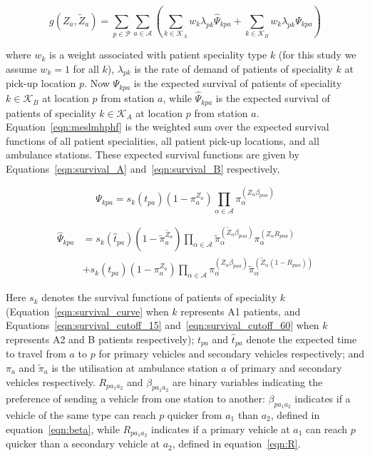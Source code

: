 \documentclass[preprint,12pt]{elsarticle}
\begin{document}
\begin{equation}\label{eqn:meslmhphf}
g\left(Z_a, \tilde{Z}_a\right) = \sum_{p \in \mathcal{P}} \sum_{a \in \mathcal{A}} \left( \sum_{k \in \mathcal{K}_A}  w_k \lambda_{pk} \hat{\Psi}_{kpa} + \sum_{k \in \mathcal{K}_B}  w_k \lambda_{pk} \Psi_{kpa} \right)
\end{equation}

where $w_k$ is a weight associated with patient speciality type $k$ (for this study we assume $w_k = 1$ for all $k$), $\lambda_{pk}$ is the rate of demand of patients of speciality $k$ at pick-up location $p$. Now $\Psi_{kpa}$ is the expected survival of patients of speciality $k \in \mathcal{K}_B$ at location $p$ from station $a$, while $\hat{\Psi}_{kpa}$ is the expected survival of patients of speciality $k \in \mathcal{K}_A$ at location $p$ from station $a$. Equation~\ref{eqn:meslmhphf} is the weighted sum over the expected survival functions of all patient specialities, all patient pick-up locations, and all ambulance stations. These expected survival functions are given by Equations~\ref{eqn:survival_A} and~\ref{eqn:survival_B} respectively,

\begin{equation}\label{eqn:survival_A}
\Psi_{kpa} = s_k\left( t_{pa} \right) \left(1 - \pi_{a}^{Z_a} \right) \prod_{\alpha \in \mathcal{A}} \pi_{\alpha}^{\left(Z_{\alpha} \beta_{p\alpha a} \right)}
\end{equation}

\begin{align}\label{eqn:survival_B}
\hat{\Psi}_{kpa} &= s_k\left(\hat{t}_{pa}\right) \left(1 - \tilde{\pi}_{a}^{\tilde{Z}_a} \right) \prod_{\alpha \in \mathcal{A}} \tilde{\pi}_{\alpha}^{\left(\tilde{Z}_{\alpha} \beta_{p\alpha a}\right)} \pi_{\alpha}^{\left(Z_{\alpha} R_{p \alpha a}\right) } \nonumber \\
&+ s_k\left(t_{pa}\right) \left(1 - \pi_{a}^{Z_a} \right) \prod_{\alpha \in \mathcal{A}} \pi_{\alpha}^{\left(Z_{\alpha}\beta_{p\alpha a}\right)} \tilde{\pi}_{\alpha}^{\left(\tilde{Z}_{\alpha} \left(1 - R _{p a\alpha}\right)\right)}
\end{align}


Here $s_k$ denotes the survival functions of patients of speciality $k$ (Equation~\ref{eqn:survival_curve} when $k$ represents A1 patients, and Equations~\ref{eqn:survival_cutoff_15} and~\ref{eqn:survival_cutoff_60} when $k$ represents A2 and B patients respectively); $t_{pa}$ and $\hat{t}_{pa}$ denote the expected time to travel from $a$ to $p$ for primary vehicles and secondary vehicles respectively; and $\pi_{a}$ and $\tilde{\pi}_{a}$ is the utilisation at ambulance station $a$ of primary and secondary vehicles respectively.
$R_{p a_1 a_2}$ and $\beta_{p a_1 a_2}$ are binary variables indicating the preference of sending a vehicle from one station to another:
$\beta_{p a_1 a_2}$ indicates if a vehicle of the same type can reach $p$ quicker from $a_1$ than $a_2$, defined in equation~\ref{eqn:beta}, while $R_{p a_1 a_2}$ indicates if a primary vehicle at $a_1$ can reach $p$ quicker than a secondary vehicle at $a_2$, defined in equation~\ref{eqn:R}.
\end{document}

